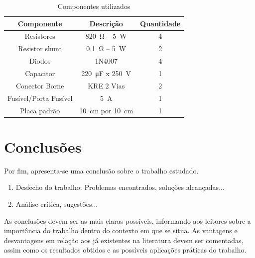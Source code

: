 \begin{table}[!hb]
	\centering
	\caption{Componentes utilizados}
	\label{tab:componentes}
	\begin{tabular}{@{}ccc@{}}
		\toprule
		\textbf{Componente} & \textbf{Descrição} & \textbf{Quantidade} \\ \midrule
		Resistores          & \SI{820}{\ohm} -- \SI{5}{\W}             & 4                   \\
		Resistor shunt      & \SI{0.1}{\ohm} -- \SI{5}{\W}             & 2                   \\
		Diodos              & 1N4007             & 4                   \\
		Capacitor           & \SI{220}{\micro\farad} x \SI{250}{\V}      & 1                   \\
		Conector Borne      &  KRE 2 Vias    & 2                   \\
		Fusível/Porta Fusível     &  \SI{5}{\A}  & 1                  \\
		Placa padrão        & \SI{10}{\cm} por \SI{10}{\cm}         & 1                   \\ \bottomrule
	\end{tabular}
\end{table}



\section{Conclusões} 

Por fim, apresenta-se uma conclusão sobre o trabalho estudado.
\begin{enumerate}								
	\item  Desfecho do trabalho. Problemas encontrados, soluções alcançadas...
	\item  Análise crítica, sugestões...
\end{enumerate}


As conclusões devem ser as mais claras possíveis, informando aos leitores sobre a importância do trabalho dentro do contexto em que se situa. As vantagens e desvantagens em relação aos já existentes na literatura devem ser comentadas, assim como os resultados obtidos e as possíveis aplicações práticas do trabalho.





\balance


